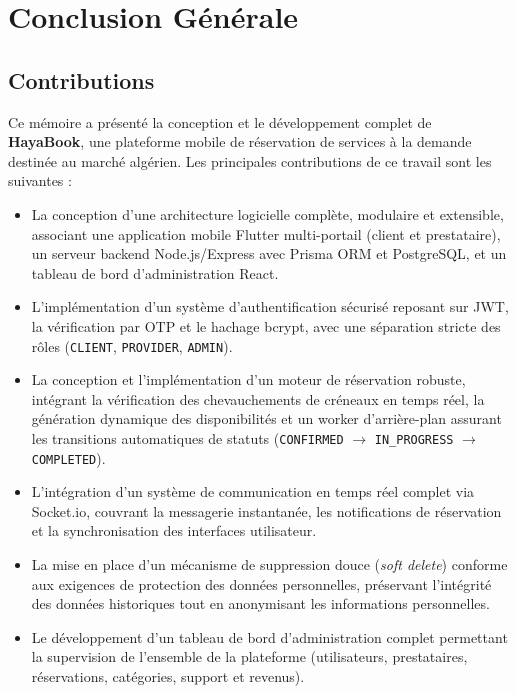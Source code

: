 \chapter{Conclusion Générale}

\section{Contributions}

Ce mémoire a présenté la conception et le développement complet de \textbf{HayaBook}, une plateforme mobile de réservation de services à la demande destinée au marché algérien. Les principales contributions de ce travail sont les suivantes :

\begin{itemize}
    \item La conception d'une architecture logicielle complète, modulaire et extensible, associant une application mobile Flutter multi-portail (client et prestataire), un serveur backend Node.js/Express avec Prisma ORM et PostgreSQL, et un tableau de bord d'administration React.
    \item L'implémentation d'un système d'authentification sécurisé reposant sur JWT, la vérification par OTP et le hachage bcrypt, avec une séparation stricte des rôles (\texttt{CLIENT}, \texttt{PROVIDER}, \texttt{ADMIN}).
    \item La conception et l'implémentation d'un moteur de réservation robuste, intégrant la vérification des chevauchements de créneaux en temps réel, la génération dynamique des disponibilités et un worker d'arrière-plan assurant les transitions automatiques de statuts (\texttt{CONFIRMED} $\rightarrow$ \texttt{IN\_PROGRESS} $\rightarrow$ \texttt{COMPLETED}).
    \item L'intégration d'un système de communication en temps réel complet via Socket.io, couvrant la messagerie instantanée, les notifications de réservation et la synchronisation des interfaces utilisateur.
    \item La mise en place d'un mécanisme de suppression douce (\textit{soft delete}) conforme aux exigences de protection des données personnelles, préservant l'intégrité des données historiques tout en anonymisant les informations personnelles.
    \item Le développement d'un tableau de bord d'administration complet permettant la supervision de l'ensemble de la plateforme (utilisateurs, prestataires, réservations, catégories, support et revenus).
\end{itemize}

